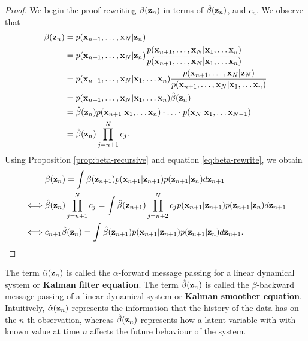 \documentclass[11pt]{article}
\numberwithin{equation}{section}
\newcommand{\x}{{\bf x}}
\newcommand{\z}{{\bf z}}
\newtheorem{proposition}{Proposition}[section]
\begin{document}
\begin{proof}
	We begin the proof rewriting $\beta(\z_n)$ in terms of $\hat\beta(\z_n)$, and $c_n$. We observe that
	\begin{align}
		\beta(\z_n) &= p(\x_{n+1}, \ldots, \x_N \vert \z_n)\\
		&= p(\x_{n+1}, \ldots, \x_N \vert \z_n) \frac{p(\x_{n+1}, \ldots, \x_N \vert \x_1, \ldots \x_n)}{p(\x_{n+1}, \ldots, \x_N \vert \x_1, \ldots \x_n)} \\
		&= p(\x_{n+1}, \ldots, \x_N \vert \x_1, \ldots \x_n) \frac{p(\x_{n+1}, \ldots, \x_N \vert \z_N)}{p(\x_{n+1}, \ldots, \x_N \vert \x_1, \ldots \x_n)}\\
		&= p(\x_{n+1}, \ldots, \x_N \vert \x_1, \ldots \x_n) \hat\beta(\z_n)\\
		&= \hat\beta(\z_n) p(\x_{n+1} \vert \x_1, \ldots \x_n) \cdot \ldots \cdot p(\x_{N} \vert \x_1, \ldots \x_{N-1})\\
		&= \hat\beta(\z_n) \prod_{j=n+1}^N c_j \label{eq:beta-rewrite}.
	\end{align}
	Using Proposition \ref{prop:beta-recursive} and equation \eqref{eq:beta-rewrite}, we obtain
	\begin{align}
		&\beta(\z_n) = \int  \beta(\z_{n+1})p(\x_{n+1}\vert \z_{n+1}) p(\z_{n+1}\vert \z_n) d\z_{n+1}\\
		\iff& \hat\beta(\z_n) \prod_{j=n+1}^N c_j = \int \hat\beta(\z_{n+1}) \prod_{j=n+2}^N c_jp(\x_{n+1}\vert \z_{n+1}) p(\z_{n+1}\vert \z_n) d\z_{n+1}\\
		\iff& c_{n+1} \hat\beta(\z_n) = \int  \hat\beta(\z_{n+1}) p(\x_{n+1}\vert \z_{n+1}) p(\z_{n+1}\vert \z_n) d\z_{n+1}.
	\end{align}
\end{proof}

%

The term $\hat\alpha(\z_n)$ is called the $\alpha$-forward message passing for a linear dynamical system or \textbf{Kalman filter equation}.  The term $\hat\beta(\z_n)$ is called the $\beta$-backward message passing of a linear dynamical system or \textbf{Kalman smoother equation}. Intuitively, $\hat\alpha(\z_n)$ represents the information that the history of the data has on the $n$-th observation, whereas $\hat\beta(\z_n)$ represents how a latent variable with with known value at time $n$ affects the future behaviour of the system.
\end{document}
